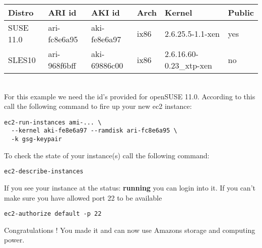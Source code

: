 \begin{tabular}[h]{|p{2cm}|p{2.6cm}|p{2.6cm}|p{1cm}|p{4cm}|p{1.5cm}|}
\hline
\textbf{Distro} & \textbf{ARI id} & \textbf{AKI id} & \textbf{Arch} &
\textbf{Kernel} & \textbf{Public} \\
\hline
SUSE 11.0 & ari-fc8e6a95 & aki-fe8e6a97 & ix86    & 2.6.25.5-1.1-xen & yes\\
SLES10    & ari-968f6bff & aki-69886c00 & ix86 & 2.6.16.60-0.23\_xtp-xen & no\\
\hline
\end{tabular}\\

For this example we need the id's provided for openSUSE 11.0. According
to this call the following command to fire up your new ec2 instance:

\begin{Command}{13cm}
\begin{verbatim}
ec2-run-instances ami-... \
  --kernel aki-fe8e6a97 --ramdisk ari-fc8e6a95 \
  -k gsg-keypair
\end{verbatim}
\end{Command}

To check the state of your instance(s) call the following command:

\begin{Command}{10cm}
\begin{verbatim}
ec2-describe-instances
\end{verbatim}
\end{Command}

If you see your instance at the status: \textbf{running} you can login
into it. If you can't make sure you have allowed port 22 to be available

\begin{Command}{10cm}
\begin{verbatim}
ec2-authorize default -p 22
\end{verbatim}
\end{Command}

Congratulations ! You made it and can now use Amazons storage and
computing power.

